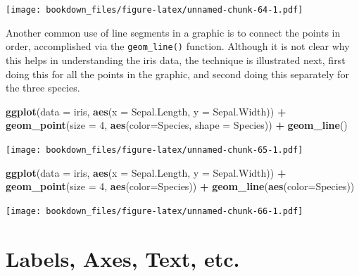 \documentclass[]{krantz}
\makeatletter
\newenvironment{Shaded}{\begin{snugshade}}{\end{snugshade}}
\newcommand{\KeywordTok}[1]{\textcolor[rgb]{0.27,0.27,0.27}{\textbf{#1}}}
\newcommand{\DataTypeTok}[1]{\textcolor[rgb]{0.27,0.27,0.27}{#1}}
\newcommand{\DecValTok}[1]{\textcolor[rgb]{0.06,0.06,0.06}{#1}}
\newcommand{\StringTok}[1]{\textcolor[rgb]{0.5,0.5,0.5}{#1}}
\newcommand{\OperatorTok}[1]{\textcolor[rgb]{0.43,0.43,0.43}{\textbf{#1}}}
\newcommand{\NormalTok}[1]{#1}
\newenvironment{kframe}{%
\medskip{}
\setlength{\fboxsep}{.8em}
 \def\at@end@of@kframe{}%
 \ifinner\ifhmode%
  \def\at@end@of@kframe{\end{minipage}}%
  \begin{minipage}{\columnwidth}%
 \fi\fi%
 \def\FrameCommand##1{\hskip\@totalleftmargin \hskip-\fboxsep
 \colorbox{shadecolor}{##1}\hskip-\fboxsep
     \hskip-\linewidth \hskip-\@totalleftmargin \hskip\columnwidth}%
 \MakeFramed {\advance\hsize-\width
   \@totalleftmargin\z@ \linewidth\hsize
   \@setminipage}}%
 {\par\unskip\endMakeFramed%
 \at@end@of@kframe}
\renewenvironment{Shaded}{\begin{kframe}}{\end{kframe}}
\makeatother
\begin{document}
\texttt{[image: bookdown\_files/figure-latex/unnamed-chunk-64-1.pdf]}

Another common use of line segments in a graphic is to connect the
points in order, accomplished via the \texttt{geom\_line()} function.
Although it is not clear why this helps in understanding the iris data,
the technique is illustrated next, first doing this for all the points
in the graphic, and second doing this separately for the three species.

\begin{Shaded}
\begin{Highlighting}[]
\KeywordTok{ggplot}\NormalTok{(}\DataTypeTok{data =}\NormalTok{ iris, }\KeywordTok{aes}\NormalTok{(}\DataTypeTok{x =}\NormalTok{ Sepal.Length, }\DataTypeTok{y =}\NormalTok{ Sepal.Width)) }\OperatorTok{+}\StringTok{ }
\StringTok{    }\KeywordTok{geom_point}\NormalTok{(}\DataTypeTok{size =} \DecValTok{4}\NormalTok{, }\KeywordTok{aes}\NormalTok{(}\DataTypeTok{color=}\NormalTok{Species, }\DataTypeTok{shape =}\NormalTok{ Species)) }\OperatorTok{+}\StringTok{ }
\StringTok{    }\KeywordTok{geom_line}\NormalTok{()}
\end{Highlighting}
\end{Shaded}

\texttt{[image: bookdown\_files/figure-latex/unnamed-chunk-65-1.pdf]}

\begin{Shaded}
\begin{Highlighting}[]
\KeywordTok{ggplot}\NormalTok{(}\DataTypeTok{data =}\NormalTok{ iris, }\KeywordTok{aes}\NormalTok{(}\DataTypeTok{x =}\NormalTok{ Sepal.Length, }\DataTypeTok{y =}\NormalTok{ Sepal.Width)) }\OperatorTok{+}\StringTok{ }
\StringTok{    }\KeywordTok{geom_point}\NormalTok{(}\DataTypeTok{size =} \DecValTok{4}\NormalTok{, }\KeywordTok{aes}\NormalTok{(}\DataTypeTok{color=}\NormalTok{Species)) }\OperatorTok{+}\StringTok{ }
\StringTok{    }\KeywordTok{geom_line}\NormalTok{(}\KeywordTok{aes}\NormalTok{(}\DataTypeTok{color=}\NormalTok{Species))}
\end{Highlighting}
\end{Shaded}

\texttt{[image: bookdown\_files/figure-latex/unnamed-chunk-66-1.pdf]}

\section{Labels, Axes, Text, etc.}\label{labels-axes-text-etc.}
\end{document}
